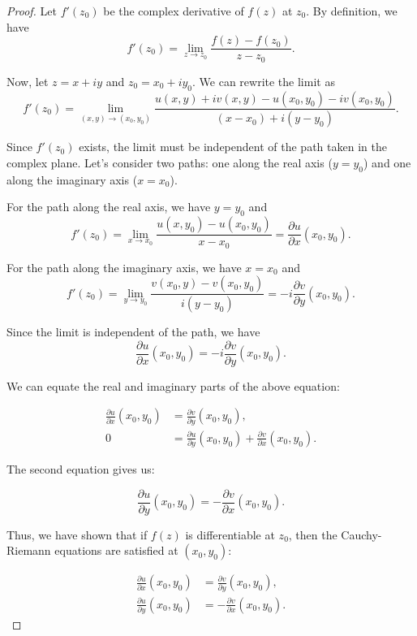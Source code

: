 \documentclass[12pt,openany]{book}
\theoremstyle{definition}
\begin{document}
	\begin{proof}
		Let $f'(z_0)$ be the complex derivative of $f(z)$ at $z_0$. By definition, we have
		\[
		f'(z_0) = \lim_{z \to z_0} \frac{f(z) - f(z_0)}{z - z_0}.
		\]
		
		Now, let $z = x + iy$ and $z_0 = x_0 + iy_0$. We can rewrite the limit as
		\[
		f'(z_0) = \lim_{(x, y) \to (x_0, y_0)} \frac{u(x, y) + iv(x, y) - u(x_0, y_0) - iv(x_0, y_0)}{(x - x_0) + i(y - y_0)}.
		\]
		
		Since $f'(z_0)$ exists, the limit must be independent of the path taken in the complex plane. Let's consider two paths: one along the real axis ($y = y_0$) and one along the imaginary axis ($x = x_0$).
		
		For the path along the real axis, we have $y = y_0$ and
		\[
		f'(z_0) = \lim_{x \to x_0} \frac{u(x, y_0) - u(x_0, y_0)}{x - x_0} = \frac{\partial u}{\partial x}(x_0, y_0).
		\]
		
		For the path along the imaginary axis, we have $x = x_0$ and
		\[
		f'(z_0) = \lim_{y \to y_0} \frac{v(x_0, y) - v(x_0, y_0)}{i(y - y_0)} = -i\frac{\partial v}{\partial y}(x_0, y_0).
		\]
		
		Since the limit is independent of the path, we have
		\[
		\frac{\partial u}{\partial x}(x_0, y_0) = -i\frac{\partial v}{\partial y}(x_0, y_0).
		\]
		
		We can equate the real and imaginary parts of the above equation:
		
		\begin{align*}
		\frac{\partial u}{\partial x}(x_0, y_0) &= \frac{\partial v}{\partial y}(x_0, y_0), \\
		0 &= \frac{\partial u}{\partial y}(x_0, y_0) + \frac{\partial v}{\partial x}(x_0, y_0).
		\end{align*}
		
		The second equation gives us:
		
		\[
		\frac{\partial u}{\partial y}(x_0, y_0) = -\frac{\partial v}{\partial x}(x_0, y_0).
		\]
		
		Thus, we have shown that if $f(z)$ is differentiable at $z_0$, then the Cauchy-Riemann equations are satisfied at $(x_0, y_0)$:
		
		\begin{align*}
		\frac{\partial u}{\partial x}(x_0, y_0) &= \frac{\partial v}{\partial y}(x_0, y_0), \\
		\frac{\partial u}{\partial y}(x_0, y_0) &= -\frac{\partial v}{\partial x}(x_0, y_0).
		\end{align*}
	\end{proof}
\end{document}

